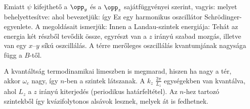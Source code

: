     Emiatt $\psi$ kifejthető a $\opp_y$ és a $\opp_z$ sajátfüggvényei szerint, vagyis:
    melyet behelyettesítve:
    ahol bevezetjük:
    így
    Ez egy harmonikus oszcillátor Schrödinger-egyenlete.
   A megoldásait ismerjük:
    Innen a Landau-szintek energiája:
    Tehát az energia két részből tevődik össze, egyrészt van a $z$ irányú szabad mozgás, illetve van egy $x$--$y$ síkú oszcillálás.
   A térre merőleges oszcillálás kvantumjának nagysága függ a $B$-től. 
    
    A kvantáltság termodinamikai limeszben is megmarad, hiszen ha nagy a tér, akkor $\omega_c$ nagy, így $n$-ben a szintek látszanak.
   A $k_z$ $\frac{2\pi}{L_z}$ egységekben van kvantálva, ahol $L_z$ a $z$ irányú kiterjedés (periodikus határfeltétel).
   Az $n$-hez tartozó szintekből így kvázifolytonos alsávok lesznek, melyek át is fedhetnek.
    
